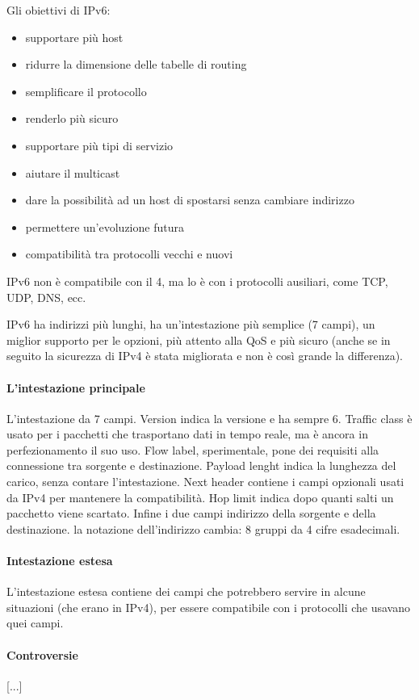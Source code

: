Gli obiettivi di IPv6:
\begin{itemize}
\item supportare più host
\item ridurre la dimensione delle tabelle di routing
\item semplificare il protocollo
\item renderlo più sicuro
\item supportare più tipi di servizio
\item aiutare il multicast
\item dare la possibilità ad un host di spostarsi senza cambiare indirizzo
\item permettere un'evoluzione futura
\item compatibilità tra protocolli vecchi e nuovi
\end{itemize}
IPv6 non è compatibile con il 4, ma lo è con i protocolli ausiliari, come TCP, UDP, DNS, ecc.

IPv6 ha indirizzi più lunghi, ha un'intestazione più semplice (7 campi), un miglior supporto per le opzioni, più attento alla QoS e più sicuro (anche se in seguito la sicurezza di IPv4 è stata migliorata e non è così grande la differenza).

\paragraph{L'intestazione principale}
L'intestazione da 7 campi.
Version indica la versione e ha sempre 6.
Traffic class è usato per i pacchetti che trasportano dati in tempo reale, ma è ancora in perfezionamento il suo uso.
Flow label, sperimentale, pone dei requisiti alla connessione tra sorgente e destinazione.
Payload lenght indica la lunghezza del carico, senza contare l'intestazione.
Next header contiene i campi opzionali usati da IPv4 per mantenere la compatibilità.
Hop limit indica dopo quanti salti un pacchetto viene scartato.
Infine i due campi indirizzo della sorgente e della destinazione.
la notazione dell'indirizzo cambia: 8 gruppi da 4 cifre esadecimali.

\paragraph{Intestazione estesa}
L'intestazione estesa contiene dei campi che potrebbero servire in alcune situazioni (che erano in IPv4), per essere compatibile con i protocolli che usavano quei campi.

\paragraph{Controversie}
[...]

